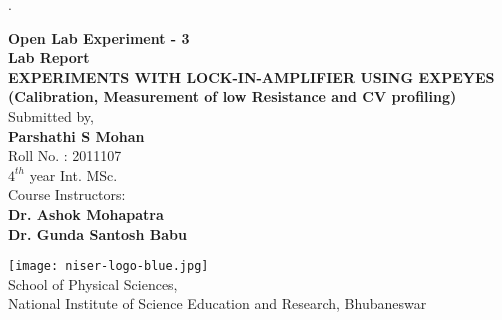 \documentclass{article}
\begin{document}
\begin{titlepage}
.
\centering


\vspace{.7in}

\textup{\Large {\bf Open Lab Experiment - 3}
}\\[0.3in]
\textup{\Large {\bf Lab Report}
}\\[0.5in]
\Large \textbf {EXPERIMENTS WITH LOCK-IN-AMPLIFIER USING EXPEYES
(Calibration, Measurement of low Resistance and CV profiling)}\\[0.5in]


       

\Large Submitted by, \\[0.3in]
\Large\textbf{Parshathi S Mohan}\\[0.1in]
\Large{Roll No. : 2011107}\\[0.1in]

\Large{$4^{th}$ year Int. MSc.}\\[0.1in]


\vspace{.2in}
\centering
\Large Course Instructors: \\[0.2in]
\Large\textbf{Dr. Ashok Mohapatra}\\[0.1in]
\Large\textbf{Dr. Gunda Santosh Babu}\\[0.1in]
\vspace{.3in}

\texttt{[image: niser-logo-blue.jpg]}\\
\vspace{.3in}
School of Physical Sciences,\\[0.1in]

\Large{National Institute of Science Education and Research, Bhubaneswar}




\end{titlepage}
\newpage
\begin{center}
  \tableofcontents  
\end{center}

\clearpage




\normalsize 
 
\end{document}
